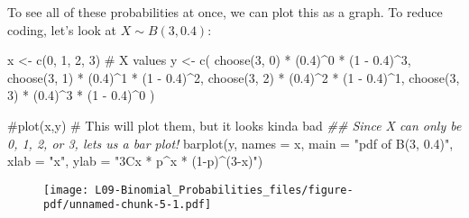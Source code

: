 \documentclass[
  letterpaper,
  DIV=11,
  numbers=noendperiod]{scrreprt}
\newenvironment{Shaded}{\begin{snugshade}}{\end{snugshade}}
\newcommand{\AttributeTok}[1]{\textcolor[rgb]{0.40,0.45,0.13}{#1}}
\newcommand{\CommentTok}[1]{\textcolor[rgb]{0.37,0.37,0.37}{#1}}
\newcommand{\DecValTok}[1]{\textcolor[rgb]{0.68,0.00,0.00}{#1}}
\newcommand{\DocumentationTok}[1]{\textcolor[rgb]{0.37,0.37,0.37}{\textit{#1}}}
\newcommand{\FloatTok}[1]{\textcolor[rgb]{0.68,0.00,0.00}{#1}}
\newcommand{\FunctionTok}[1]{\textcolor[rgb]{0.28,0.35,0.67}{#1}}
\newcommand{\NormalTok}[1]{\textcolor[rgb]{0.00,0.23,0.31}{#1}}
\newcommand{\OtherTok}[1]{\textcolor[rgb]{0.00,0.23,0.31}{#1}}
\newcommand{\SpecialCharTok}[1]{\textcolor[rgb]{0.37,0.37,0.37}{#1}}
\newcommand{\StringTok}[1]{\textcolor[rgb]{0.13,0.47,0.30}{#1}}
\begin{document}
To see all of these probabilities at once, we can plot this as a graph.
To reduce coding, let's look at \(X\sim B(3, 0.4)\):

\begin{Shaded}
\begin{Highlighting}[]
\NormalTok{x }\OtherTok{\textless{}{-}} \FunctionTok{c}\NormalTok{(}\DecValTok{0}\NormalTok{, }\DecValTok{1}\NormalTok{, }\DecValTok{2}\NormalTok{, }\DecValTok{3}\NormalTok{) }\CommentTok{\# X values}
\NormalTok{y }\OtherTok{\textless{}{-}} \FunctionTok{c}\NormalTok{(}
    \FunctionTok{choose}\NormalTok{(}\DecValTok{3}\NormalTok{, }\DecValTok{0}\NormalTok{) }\SpecialCharTok{*}\NormalTok{ (}\FloatTok{0.4}\NormalTok{)}\SpecialCharTok{\^{}}\DecValTok{0} \SpecialCharTok{*}\NormalTok{ (}\DecValTok{1} \SpecialCharTok{{-}} \FloatTok{0.4}\NormalTok{)}\SpecialCharTok{\^{}}\DecValTok{3}\NormalTok{,}
    \FunctionTok{choose}\NormalTok{(}\DecValTok{3}\NormalTok{, }\DecValTok{1}\NormalTok{) }\SpecialCharTok{*}\NormalTok{ (}\FloatTok{0.4}\NormalTok{)}\SpecialCharTok{\^{}}\DecValTok{1} \SpecialCharTok{*}\NormalTok{ (}\DecValTok{1} \SpecialCharTok{{-}} \FloatTok{0.4}\NormalTok{)}\SpecialCharTok{\^{}}\DecValTok{2}\NormalTok{,}
    \FunctionTok{choose}\NormalTok{(}\DecValTok{3}\NormalTok{, }\DecValTok{2}\NormalTok{) }\SpecialCharTok{*}\NormalTok{ (}\FloatTok{0.4}\NormalTok{)}\SpecialCharTok{\^{}}\DecValTok{2} \SpecialCharTok{*}\NormalTok{ (}\DecValTok{1} \SpecialCharTok{{-}} \FloatTok{0.4}\NormalTok{)}\SpecialCharTok{\^{}}\DecValTok{1}\NormalTok{,}
    \FunctionTok{choose}\NormalTok{(}\DecValTok{3}\NormalTok{, }\DecValTok{3}\NormalTok{) }\SpecialCharTok{*}\NormalTok{ (}\FloatTok{0.4}\NormalTok{)}\SpecialCharTok{\^{}}\DecValTok{3} \SpecialCharTok{*}\NormalTok{ (}\DecValTok{1} \SpecialCharTok{{-}} \FloatTok{0.4}\NormalTok{)}\SpecialCharTok{\^{}}\DecValTok{0}
\NormalTok{)}

\CommentTok{\#plot(x,y) \# This will plot them, but it looks kinda bad}
\DocumentationTok{\#\# Since X can only be 0, 1, 2, or 3, let\textquotesingle{}s us a bar plot!}
\FunctionTok{barplot}\NormalTok{(y, }\AttributeTok{names =}\NormalTok{ x,}
  \AttributeTok{main =} \StringTok{"pdf of B(3, 0.4)"}\NormalTok{, }\AttributeTok{xlab =} \StringTok{"x"}\NormalTok{,}
  \AttributeTok{ylab =} \StringTok{"3Cx * p\^{}x * (1{-}p)\^{}(3{-}x)"}\NormalTok{)}
\end{Highlighting}
\end{Shaded}

\begin{figure}[H]

{\centering \texttt{[image: L09-Binomial\_Probabilities\_files/figure-pdf/unnamed-chunk-5-1.pdf]}

}

\end{figure}
\end{document}
